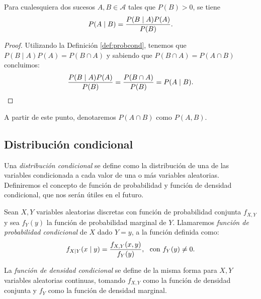 \documentclass[oneside,openright,titlepage,numbers=noenddot,openany,headinclude,footinclude=true,
cleardoublepage=empty,abstractoff,BCOR=5mm,paper=a4,fontsize=12pt,main=spanish]{scrreprt}
\begin{document}
\begin{theorem} \label{th:bayes}
Para cualesquiera dos sucesos $A,B \in \mathcal{A}$ tales que $P(B)>0$, se tiene $$P(A \mid B)=\frac{\displaystyle P(B \mid A) P(A)}{\displaystyle P(B)}.$$
\end{theorem}

\begin{proof}
 Utilizando la Definición \ref{def:probcond}, tenemos que $P(B \mid A) P(A)=P(B\cap A)$ y sabiendo que $P(B \cap A)=P(A \cap B)$ concluimos: $$\frac{\displaystyle P(B \mid A) P(A)}{\displaystyle P(B)}=\frac{\displaystyle P(B \cap A)}{\displaystyle P(B)}=P(A \mid B).$$
\end{proof}

\begin{notation}
A partir de este punto, denotaremos $P(A\cap B)$ como $P(A,B)$.
\end{notation}

\subsection{Distribución condicional}

Una \textit{distribución condicional} se define como la distribución de una de las variables condicionada a cada valor de una o más variables aleatorias. Definiremos el concepto de función de probabilidad y función de densidad condicional, que nos serán útiles en el futuro.\\

\begin{definition} \label{def:funcprobcond}
Sean $X,Y$ variables aleatorias discretas con función de probabilidad conjunta $f_{X,Y}$ y sea $f_{Y}(y)$ la función de probabilidad marginal de $Y$. Llamaremos \textit{función de probabilidad condicional} de $X$ dado $Y=y$, a la función definida como: $$f_{X\mid Y}(x \mid y)=\frac{\displaystyle f_{X,Y}(x,y)}{\displaystyle f_Y(y)}, \ \ \text{con} \ f_{Y}(y) \neq 0.$$

\begin{remark}
La \textit{función de densidad condicional} se define de la misma forma para $X,Y$ variables aleatorias continuas, tomando $f_{X,Y}$ como la función de densidad conjunta y $f_{Y}$ como la función de densidad marginal.
\end{remark}
\end{definition}\

\end{document}
